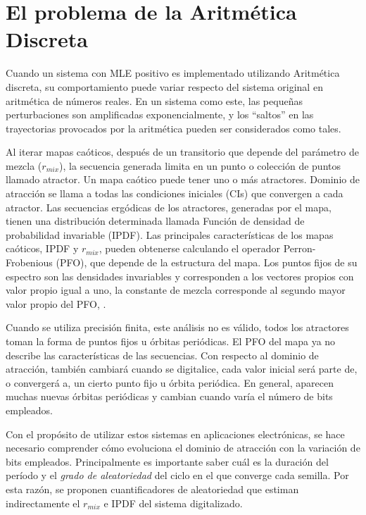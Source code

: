 \section{El problema de la Aritmética Discreta}

Cuando un sistema con MLE positivo es implementado utilizando Aritmética discreta, su comportamiento puede variar respecto del sistema original en aritmética de números reales. En un sistema como este, las pequeñas perturbaciones son amplificadas exponencialmente, y los ``saltos'' en las trayectorias provocados por la aritmética pueden ser considerados como tales.

Al iterar mapas caóticos, después de un transitorio que depende del parámetro de mezcla ($r_{mix}$), la secuencia generada limita en un punto o colección de puntos llamado atractor.
Un mapa caótico puede tener uno o más atractores.
Dominio de atracción se llama a todas las condiciones iniciales (CIs) que convergen a cada atractor.
Las secuencias ergódicas de los atractores, generadas por el mapa, tienen una distribución determinada llamada Función de densidad de probabilidad invariable (IPDF).
Las principales características de los mapas caóticos, IPDF y $r_{mix}$, pueden obtenerse calculando el operador Perron-Frobenious (PFO), que depende de la estructura del mapa.
Los puntos fijos de su espectro son las densidades invariables y corresponden a los vectores propios con valor propio igual a uno, la constante de mezcla corresponde al segundo mayor valor propio del PFO, \cite{Lasota1994, Lasota1973}.

Cuando se utiliza precisión finita, este análisis no es válido, todos los atractores toman la forma de puntos fijos u órbitas periódicas.
El PFO del mapa ya no describe las características de las secuencias.
Con respecto al dominio de atracción, también cambiará cuando se digitalice, cada valor inicial será parte de, o convergerá a, un cierto punto fijo u órbita periódica.
En general, aparecen muchas nuevas órbitas periódicas y cambian cuando varía el número de bits empleados.

Con el propósito de utilizar estos sistemas en aplicaciones electrónicas, se hace necesario comprender cómo evoluciona el dominio de atracción con la variación de bits empleados.
Principalmente es importante saber cuál es la duración del período y el \textsl{grado de aleatoriedad} del ciclo en el que converge cada semilla.
Por esta razón, se proponen cuantificadores de aleatoriedad que estiman indirectamente el $r_{mix}$ e IPDF del sistema digitalizado.